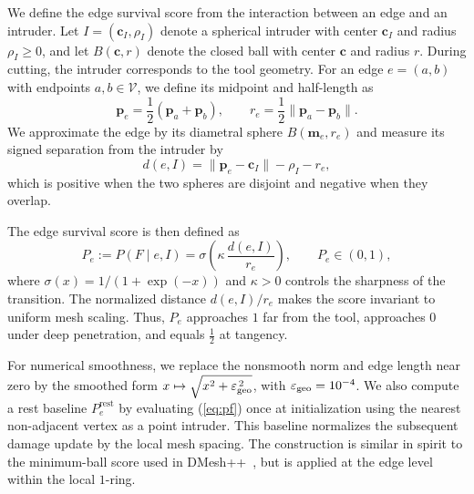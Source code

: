 \documentclass[letterpaper, 10 pt, conference]{ieeeconf}  %
\theoremstyle{tight}
\begin{document}
We define the edge survival score from the interaction between an edge and an
intruder. Let $I=(\mathbf{c}_I,\rho_I)$ denote a spherical intruder with center
$\mathbf{c}_I$ and radius $\rho_I\geq0$, and let $B(\mathbf{c},r)$ denote the
closed ball with center $\mathbf{c}$ and radius $r$. During cutting, the
intruder corresponds to the tool geometry. For an edge $e=(a,b)$ with endpoints
$a,b\in\mathcal{V}$, we define its midpoint and half-length as
\[
  \mathbf{p}_e=\frac{1}{2}(\mathbf{p}_a+\mathbf{p}_b),
  \qquad
  r_e=\frac{1}{2}\|\mathbf{p}_a-\mathbf{p}_b\|.
\]
We approximate the edge by its diametral sphere $B(\mathbf{m}_e,r_e)$ and
measure its signed separation from the intruder by
\begin{equation}
  d(e,I)=\|\mathbf{p}_e-\mathbf{c}_I\|-\rho_I-r_e ,
  \label{eq:sdist}
\end{equation}
which is positive when the two spheres are disjoint and negative when they
overlap.

The edge survival score is then defined as
\begin{equation}
  P_e := P(F\mid e,I)
  =
  \sigma\!\left(\kappa\,\frac{d(e,I)}{r_e}\right),
  \qquad
  P_e\in(0,1),
  \label{eq:pf}
\end{equation}
where $\sigma(x)=1/(1+\exp(-x))$ and $\kappa>0$ controls the sharpness of the
transition. The normalized distance $d(e,I)/r_e$ makes the score invariant to
uniform mesh scaling. Thus, $P_e$ approaches $1$ far from the tool, approaches
$0$ under deep penetration, and equals $\frac{1}{2}$ at tangency.

For numerical smoothness, we replace the nonsmooth norm and edge length near
zero by the smoothed form $x\mapsto\sqrt{x^2+\varepsilon_{\mathrm{geo}}^{\,2}}$, with
$\varepsilon_{\mathrm{geo}}=10^{-4}$. We also compute a rest baseline
$P_e^{\mathrm{rest}}$ by evaluating (\ref{eq:pf}) once at initialization using
the nearest non-adjacent vertex as a point intruder. This baseline normalizes
the subsequent damage update by the local mesh spacing. The construction is
similar in spirit to the minimum-ball score used in DMesh++~\cite{son2025dmesh2},
but is applied at the edge level within the local $1$-ring.
\end{document}
